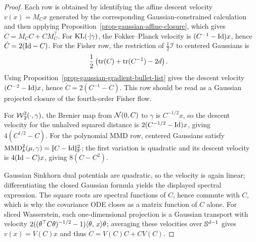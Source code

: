 \begin{proof}
	Each row is obtained by identifying the affine descent velocity $v(x)=M_Cx$ generated by the corresponding Gaussian-constrained calculation and then applying Proposition~\ref{prop-gaussian-affine-closure}, which gives $\dot C=M_CC+CM_C^\top$. For $\operatorname{KL}(\cdot|\gamma)$, the Fokker--Planck velocity is $(C^{-1}-\mathrm{Id})x$, hence $\dot C=2(\mathrm{Id}-C)$. For the Fisher row, the restriction of $\frac12\mathcal I$ to centered Gaussians is
	\[
		\frac12\left(\operatorname{tr}(C)+\operatorname{tr}(C^{-1})-2d\right).
	\]
	Using Proposition~\ref{prop-gaussian-gradient-bullet-list} gives the descent velocity $(C^{-2}-\mathrm{Id})x$, hence $\dot C=2(C^{-1}-C)$. This row should be read as a Gaussian projected closure of the fourth-order Fisher flow.

	For $\operatorname{\mathcal{W}}_2^2(\cdot,\gamma)$, the Brenier map from $\mathcal{N}(0,C)$ to $\gamma$ is $C^{-1/2}x$, so the descent velocity for the unhalved squared distance is $2(C^{-1/2}-\mathrm{Id})x$, giving $4(C^{1/2}-C)$. For the polynomial MMD row, centered Gaussians satisfy $\operatorname{MMD}_k^2(\mu,\gamma)=|\!| C-\mathrm{Id} |\!|_{\mathrm F}^2$; the first variation is quadratic and its descent velocity is $4(\mathrm{Id}-C)x$, giving $8(C-C^2)$.

	Gaussian Sinkhorn dual potentials are quadratic, so the velocity is again linear; differentiating the closed Gaussian formula yields the displayed spectral expression. The square roots are spectral functions of $C$, hence commute with $C$, which is why the covariance ODE closes as a matrix function of $C$ alone. For sliced Wasserstein, each one-dimensional projection is a Gaussian transport with velocity $2((\theta^\top C\theta)^{-1/2}-1)\langle \theta,\,x\rangle\theta$; averaging these velocities over $\mathbb{S}^{d-1}$ gives $v(x)=V(C)x$ and thus $\dot C=V(C)C+CV(C)$.
\end{proof}

